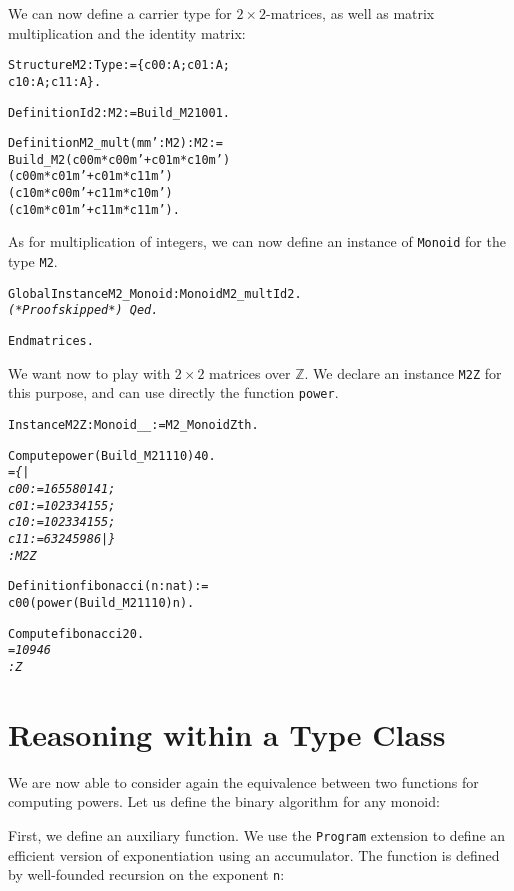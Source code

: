 \documentclass[a4]{report}
\begin{document}
We can now define a carrier type for $2\times 2$-matrices, as well as matrix multiplication and the identity matrix:

\begin{alltt}
Structure M2 : Type := \{c00 : A;  c01 : A;
                        c10 : A;  c11 : A\}.

Definition Id2 : M2 := Build_M2 1 0 0 1.

Definition M2_mult (m m':M2) : M2 :=
 Build_M2 (c00 m * c00 m' + c01 m * c10 m')
          (c00 m * c01 m' + c01 m * c11 m')
          (c10 m * c00 m' + c11 m * c10 m')
          (c10 m * c01 m' + c11 m * c11 m').
\end{alltt}

As for multiplication of integers, we can now define an instance of 
\texttt{Monoid} for the type \texttt{M2}.

\begin{alltt}
Global Instance M2_Monoid : Monoid M2_mult Id2. \it\color{red}
(*  Proof skipped *) \tt\color{black}
Qed.

End matrices.
\end{alltt}


We want now to play with $2\times 2$ matrices over $\mathbb{Z}$.
We declare an instance \texttt{M2Z} for this purpose, and can use directly
the function \texttt{power}.

\begin{alltt}
Instance M2Z : Monoid  _ _ := M2_Monoid Zth.

Compute power (Build_M2 1 1 1 0) 40.\it\color{red}
   = \{|
       c00 := 165580141;
       c01 := 102334155;
       c10 := 102334155;
       c11 := 63245986 |\}
     : M2 Z\tt\color{black}

Definition fibonacci (n:nat) :=
  c00 (power (Build_M2 1 1 1 0) n).

Compute fibonacci 20.\it\color{red}
= 10946
 :Z
\end{alltt}


\section{Reasoning within a Type Class}

We are now able to consider again the equivalence between two functions for computing
powers.
Let us define the binary algorithm for any monoid:

First, we define an auxiliary function. We use the \texttt{Program}
extension to define an efficient version of exponentiation using an
accumulator. The function is defined by well-founded recursion on the
exponent \texttt{n}:
\end{document}
